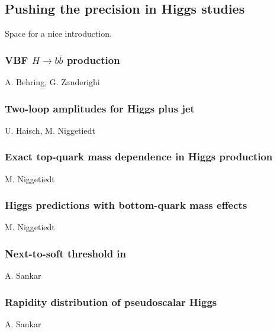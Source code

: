 \documentclass{FBR_Bericht_2025}
\begin{document}
\subsection[Pushing the precision in Higgs studies]{Pushing the precision in Higgs studies}
\begin{refsection}
Space for a nice introduction.
%
\subsubsection{VBF $H\rightarrow b\bar{b}$ production}
\begin{Namen}
A. Behring, G. Zanderighi
\end{Namen}
%
\subsubsection{Two-loop amplitudes for Higgs plus jet}
\begin{Namen}
U. Haisch, M. Niggetiedt
\end{Namen}
%
\subsubsection{Exact top-quark mass dependence in Higgs production}
\begin{Namen}
M. Niggetiedt
\end{Namen}
%
\subsubsection{Higgs predictions with bottom-quark mass effects}
\begin{Namen}
M. Niggetiedt
\end{Namen}
%
\subsubsection{Next-to-soft threshold in \bbH{}}
\begin{Namen}
A. Sankar
\end{Namen}
%
\subsubsection{Rapidity distribution of pseudoscalar Higgs}
\begin{Namen}
A. Sankar
\end{Namen}
%
\printbibliography[heading=subbibliography]
\end{refsection}
\end{document}
